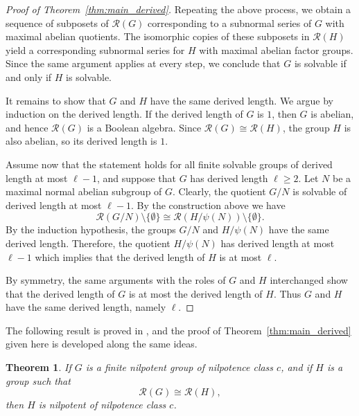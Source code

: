 \documentclass[a4paper,12pt]{article}
\newtheorem{thm}{Theorem}
\theoremstyle{definition}
\theoremstyle{remark}
\newtheorem*{rem}{Remark}
\begin{document}
\begin{proof}[Proof of Theorem~\ref{thm:main_derived}]
  Repeating the above process, we obtain a sequence of subposets of $\mathcal{R}(G)$ corresponding to a subnormal series of $G$ with maximal abelian quotients. The isomorphic copies of these subposets in $\mathcal{R}(H)$ yield a corresponding subnormal series for $H$ with maximal abelian factor groups. Since the same argument applies at every step, we conclude that $G$ is solvable if and only if $H$ is solvable.

  It remains to show that $G$ and $H$ have the same derived length. We argue by induction on the derived length. If the derived length of $G$ is $1$, then $G$ is abelian, and hence $\mathcal{R}(G)$ is a Boolean algebra. Since $\mathcal{R}(G)\cong \mathcal{R}(H)$, the group $H$ is also abelian, so its derived length is $1$.

  Assume now that the statement holds for all finite solvable groups of derived length at most $\ell-1$, and suppose that $G$ has derived length $\ell\geq 2$. Let $N$ be a maximal normal abelian subgroup of $G$. Clearly, the quotient $G/N$ is solvable of derived length at most $\ell-1$. By the construction above we have
  $$ \mathcal{R}(G/N)\setminus \{\emptyset\} \cong \mathcal{R}(H/\psi(N))\setminus \{\emptyset\}. $$
  By the induction hypothesis, the groups $G/N$ and $H/\psi(N)$ have the same derived length. Therefore, the quotient $H/\psi(N)$ has derived length at most $\ell-1$ which implies that the derived length of $H$ is at most $\ell$.

  By symmetry, the same arguments with the roles of $G$ and $H$ interchanged show that the derived length of $G$ is at most the derived length of $H$. Thus $G$ and $H$ have the same derived length, namely $\ell$.

\end{proof}



The following result is proved in \cite[Theorem~3.3]{Kay21}, and the proof of Theorem~\ref{thm:main_derived} given here is developed along the same ideas.

\begin{thm}\label{thm:nilpotence_class}
  If $G$ is a finite nilpotent group of nilpotence class $c$, and if $H$ is a group such that
  $$ \mathcal{R}(G)\cong \mathcal{R}(H), $$
  then $H$ is nilpotent of nilpotence class $c$.
\end{thm}
\end{document}

